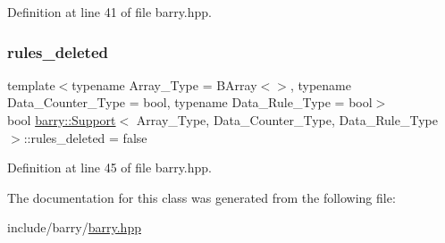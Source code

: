 Definition at line 41 of file barry.\+hpp.

\mbox{\label{classbarry_1_1_support_ab06f3a207f1d647d327a815bcedba9dd}} 
\subsubsection{\texorpdfstring{rules\+\_\+deleted}{rules\_deleted}}
{\footnotesize\ttfamily template$<$typename Array\+\_\+\+Type  = B\+Array$<$$>$, typename Data\+\_\+\+Counter\+\_\+\+Type  = bool, typename Data\+\_\+\+Rule\+\_\+\+Type  = bool$>$ \\
bool \hyperlink{classbarry_1_1_support}{barry\+::\+Support}$<$ Array\+\_\+\+Type, Data\+\_\+\+Counter\+\_\+\+Type, Data\+\_\+\+Rule\+\_\+\+Type $>$\+::rules\+\_\+deleted = false}



Definition at line 45 of file barry.\+hpp.



The documentation for this class was generated from the following file\+:\begin{DoxyCompactItemize}
\item 
include/barry/\hyperlink{barry_8hpp}{barry.\+hpp}\end{DoxyCompactItemize}
